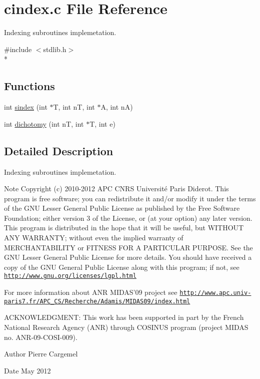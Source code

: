\section{cindex.\-c File Reference}
\label{cindex_8c}


Indexing subroutines implemetation.  


{\ttfamily \#include $<$stdlib.\-h$>$}\\*
\subsection*{Functions}
\begin{DoxyCompactItemize}
\item 
int \hyperlink{cindex_8c_a130490c253962e8ce30d4e0041e1d596}{sindex} (int $\ast$T, int n\-T, int $\ast$A, int n\-A)
\item 
int \hyperlink{cindex_8c_abc4acad4a1135eebcbbd065d6b7611a1}{dichotomy} (int n\-T, int $\ast$T, int e)
\end{DoxyCompactItemize}


\subsection{Detailed Description}
Indexing subroutines implemetation. \begin{DoxyNote}{Note}
Copyright (c) 2010-\/2012 A\-P\-C C\-N\-R\-S Université Paris Diderot. This program is free software; you can redistribute it and/or modify it under the terms of the G\-N\-U Lesser General Public License as published by the Free Software Foundation; either version 3 of the License, or (at your option) any later version. This program is distributed in the hope that it will be useful, but W\-I\-T\-H\-O\-U\-T A\-N\-Y W\-A\-R\-R\-A\-N\-T\-Y; without even the implied warranty of M\-E\-R\-C\-H\-A\-N\-T\-A\-B\-I\-L\-I\-T\-Y or F\-I\-T\-N\-E\-S\-S F\-O\-R A P\-A\-R\-T\-I\-C\-U\-L\-A\-R P\-U\-R\-P\-O\-S\-E. See the G\-N\-U Lesser General Public License for more details. You should have received a copy of the G\-N\-U General Public License along with this program; if not, see \href{http://www.gnu.org/licenses/lgpl.html}{\tt http\-://www.\-gnu.\-org/licenses/lgpl.\-html} 

For more information about A\-N\-R M\-I\-D\-A\-S'09 project see \href{http://www.apc.univ-paris7.fr/APC_CS/Recherche/Adamis/MIDAS09/index.html}{\tt http\-://www.\-apc.\-univ-\/paris7.\-fr/\-A\-P\-C\-\_\-\-C\-S/\-Recherche/\-Adamis/\-M\-I\-D\-A\-S09/index.\-html} 

A\-C\-K\-N\-O\-W\-L\-E\-D\-G\-M\-E\-N\-T\-: This work has been supported in part by the French National Research Agency (A\-N\-R) through C\-O\-S\-I\-N\-U\-S program (project M\-I\-D\-A\-S no. A\-N\-R-\/09-\/\-C\-O\-S\-I-\/009). 
\end{DoxyNote}
\begin{DoxyAuthor}{Author}
Pierre Cargemel 
\end{DoxyAuthor}
\begin{DoxyDate}{Date}
May 2012 
\end{DoxyDate}


